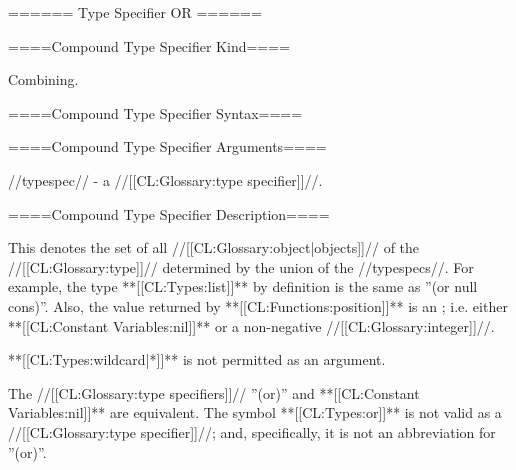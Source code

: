 ====== Type Specifier OR ======

====Compound Type Specifier Kind====

Combining.

====Compound Type Specifier Syntax====


====Compound Type Specifier Arguments====

//typespec// - a //[[CL:Glossary:type specifier]]//.

====Compound Type Specifier Description====

This denotes the set of all //[[CL:Glossary:object|objects]]// of the //[[CL:Glossary:type]]// determined by the union of the //typespecs//. For example, the type **[[CL:Types:list]]** by definition is the same as ''(or null cons)''. Also, the value returned by **[[CL:Functions:position]]** is an ; i.e. either **[[CL:Constant Variables:nil]]** or a non-negative //[[CL:Glossary:integer]]//.

**[[CL:Types:wildcard|*]]** is not permitted as an argument.

The //[[CL:Glossary:type specifiers]]// ''(or)'' and **[[CL:Constant Variables:nil]]** are equivalent. The symbol **[[CL:Types:or]]** is not valid as a //[[CL:Glossary:type specifier]]//; and, specifically, it is not an abbreviation for ''(or)''.

